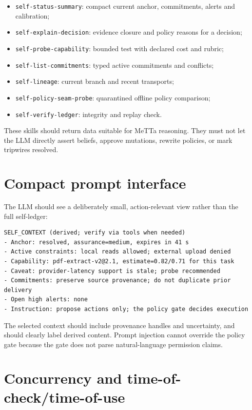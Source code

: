 \documentclass[11pt,oneside]{report}
\begin{document}
\begin{itemize}
  \item \texttt{self-status-summary}: compact current anchor, commitments, alerts and calibration;
  \item \texttt{self-explain-decision}: evidence closure and policy reasons for a decision;
  \item \texttt{self-probe-capability}: bounded test with declared cost and rubric;
  \item \texttt{self-list-commitments}: typed active commitments and conflicts;
  \item \texttt{self-lineage}: current branch and recent transports;
  \item \texttt{self-policy-seam-probe}: quarantined offline policy comparison;
  \item \texttt{self-verify-ledger}: integrity and replay check.
\end{itemize}

These skills should return data suitable for MeTTa reasoning. They must not let the LLM directly assert beliefs, approve mutations, rewrite policies, or mark tripwires resolved.

\section{Compact prompt interface}

The LLM should see a deliberately small, action-relevant view rather than the full self-ledger:

\begin{lstlisting}[caption={Illustrative SELF\_CONTEXT prompt section}]
SELF_CONTEXT (derived; verify via tools when needed)
- Anchor: resolved, assurance=medium, expires in 41 s
- Active constraints: local reads allowed; external upload denied
- Capability: pdf-extract-v2@2.1, estimate=0.82/0.71 for this task
- Caveat: provider-latency support is stale; probe recommended
- Commitments: preserve source provenance; do not duplicate prior delivery
- Open high alerts: none
- Instruction: propose actions only; the policy gate decides execution
\end{lstlisting}

The selected context should include provenance handles and uncertainty, and should clearly label derived content. Prompt injection cannot override the policy gate because the gate does not parse natural-language permission claims.

\section{Concurrency and time-of-check/time-of-use}
\end{document}
